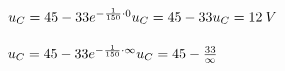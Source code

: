 \begin{multicols}{2}
\\ \\
\begin{math}
    u_C = 45-33e^{-\frac{1}{150}\cdot 0}\\
    u_C = 45 - 33\\
    u_C = 12\: V\\ \\ \\ \\
\end{math}
\\ \\
\begin{math}
    u_C = 45-33e^{-\frac{1}{150}\cdot\infty}\\
    u_C = 45 - \frac{33}{\infty}\\
\end{math}
\\
\end{multicols}

